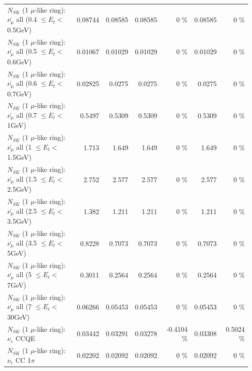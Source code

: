 \begin{table}
\begin{tabular}{| l | r | r | r  r | r  r |}
 $N_{SK}$ (1 $\mu$-like ring): $\bar{\nu_{\mu}}$ all (0.4 $\leq E_{t} <$ 0.5GeV) &         0.08744 &         0.08585 &         0.08585 &        0 \%  &         0.08585 &        0 \%  \\ 
 $N_{SK}$ (1 $\mu$-like ring): $\bar{\nu_{\mu}}$ all (0.5 $\leq E_{t} <$ 0.6GeV) &         0.01067 &         0.01029 &         0.01029 &        0 \%  &         0.01029 &        0 \%  \\ 
 $N_{SK}$ (1 $\mu$-like ring): $\bar{\nu_{\mu}}$ all (0.6 $\leq E_{t} <$ 0.7GeV) &         0.02825 &          0.0275 &          0.0275 &        0 \%  &          0.0275 &        0 \%  \\ 
   $N_{SK}$ (1 $\mu$-like ring): $\bar{\nu_{\mu}}$ all (0.7 $\leq E_{t} <$ 1GeV) &          0.5497 &          0.5309 &          0.5309 &        0 \%  &          0.5309 &        0 \%  \\ 
   $N_{SK}$ (1 $\mu$-like ring): $\bar{\nu_{\mu}}$ all (1 $\leq E_{t} <$ 1.5GeV) &           1.713 &           1.649 &           1.649 &        0 \%  &           1.649 &        0 \%  \\ 
 $N_{SK}$ (1 $\mu$-like ring): $\bar{\nu_{\mu}}$ all (1.5 $\leq E_{t} <$ 2.5GeV) &           2.752 &           2.577 &           2.577 &        0 \%  &           2.577 &        0 \%  \\ 
 $N_{SK}$ (1 $\mu$-like ring): $\bar{\nu_{\mu}}$ all (2.5 $\leq E_{t} <$ 3.5GeV) &           1.382 &           1.211 &           1.211 &        0 \%  &           1.211 &        0 \%  \\ 
   $N_{SK}$ (1 $\mu$-like ring): $\bar{\nu_{\mu}}$ all (3.5 $\leq E_{t} <$ 5GeV) &          0.8228 &          0.7073 &          0.7073 &        0 \%  &          0.7073 &        0 \%  \\ 
     $N_{SK}$ (1 $\mu$-like ring): $\bar{\nu_{\mu}}$ all (5 $\leq E_{t} <$ 7GeV) &          0.3011 &          0.2564 &          0.2564 &        0 \%  &          0.2564 &        0 \%  \\ 
    $N_{SK}$ (1 $\mu$-like ring): $\bar{\nu_{\mu}}$ all (7 $\leq E_{t} <$ 30GeV) &         0.06266 &         0.05453 &         0.05453 &        0 \%  &         0.05453 &        0 \%  \\ 
\hline
\hline
\hline
                                      $N_{SK}$ (1 $\mu$-like ring): $\nu_e$ CCQE &         0.03442 &         0.03291 &         0.03278 &  -0.4104 \%  &         0.03308 &   0.5024 \%  \\ 
                                 $N_{SK}$ (1 $\mu$-like ring): $\nu_e$ CC 1$\pi$ &         0.02202 &         0.02092 &         0.02092 &        0 \%  &         0.02092 &        0 \%  \\ 

\end{tabular}
\end{table}
